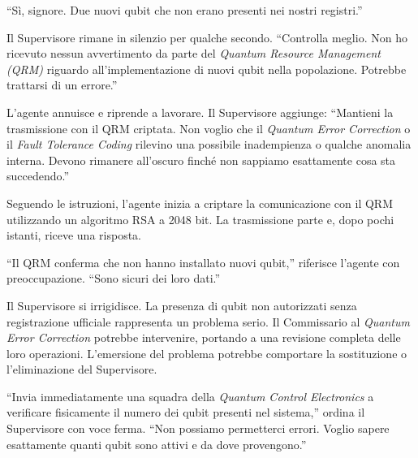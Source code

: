 \begin{dialogue}
\enquote{Sì, signore. Due nuovi qubit che non erano presenti nei nostri registri.}
\end{dialogue}




Il Supervisore rimane in silenzio per qualche secondo. ``Controlla meglio. Non ho ricevuto nessun avvertimento da parte del \textit{Quantum Resource Management (QRM)} riguardo all'implementazione di nuovi qubit nella popolazione. Potrebbe trattarsi di un errore.''

L'agente annuisce e riprende a lavorare. Il Supervisore aggiunge: ``Mantieni la trasmissione con il QRM criptata. Non voglio che il \textit{Quantum Error Correction} o il \textit{Fault Tolerance Coding} rilevino una possibile inadempienza o qualche anomalia interna. Devono rimanere all'oscuro finché non sappiamo esattamente cosa sta succedendo.''

Seguendo le istruzioni, l'agente inizia a criptare la comunicazione con il QRM utilizzando un algoritmo RSA a 2048 bit. La trasmissione parte e, dopo pochi istanti, riceve una risposta.

``Il QRM conferma che non hanno installato nuovi qubit,'' riferisce l'agente con preoccupazione. ``Sono sicuri dei loro dati.''

Il Supervisore si irrigidisce. La presenza di qubit non autorizzati senza registrazione ufficiale rappresenta un problema serio. Il Commissario al \textit{Quantum Error Correction} potrebbe intervenire, portando a una revisione completa delle loro operazioni. L'emersione del problema potrebbe comportare la sostituzione o l'eliminazione del Supervisore.

``Invia immediatamente una squadra della \textit{Quantum Control Electronics} a verificare fisicamente il numero dei qubit presenti nel sistema,'' ordina il Supervisore con voce ferma. ``Non possiamo permetterci errori. Voglio sapere esattamente quanti qubit sono attivi e da dove provengono.''


